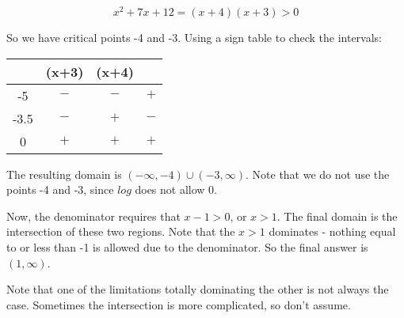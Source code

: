 \documentclass[letterpaper, 12pt]{article}
\begin{document}
\[x^2+7x+12=(x+4)(x+3)>0\]

So we have critical points -4 and -3.  Using a sign table to check the
intervals:

\bigskip

\begin{tabular}{c|cc|c}
& (x+3) & (x+4) & \\
\hline
-5 & $-$ & $-$ & $+$ \\
-3.5 & $-$ & $+$ & $-$ \\
0 & $+$ & $+$ & $+$ \\
\end{tabular}

\bigskip

\begin{center}
\end{center}

\bigskip

The resulting domain is $(-\infty,-4)\cup(-3,\infty)$.  Note that we do not use
the points -4 and -3, since $log$ does not allow 0.

\bigskip

Now, the denominator requires that $x-1>0$, or $x>1$.  The final domain is the
intersection of these two regions.  Note that the $x>1$ dominates - nothing
equal to or less than -1 is allowed due to the denominator. So the final
answer is $(1, \infty)$.

\bigskip

Note that one of the limitations totally dominating the other is not always the
case.  Sometimes the intersection is more complicated, so don't assume.
\end{document}
